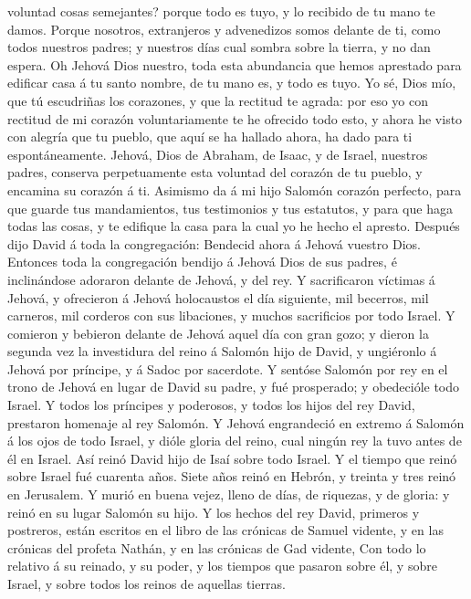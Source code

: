voluntad cosas semejantes? porque todo es tuyo, y lo recibido de tu mano
te damos.  Porque nosotros, extranjeros y advenedizos somos
delante de ti, como todos nuestros padres; y nuestros días cual sombra
sobre la tierra, y no dan espera.  Oh Jehová Dios nuestro,
toda esta abundancia que hemos aprestado para edificar casa á tu santo
nombre, de tu mano es, y todo es tuyo.  Yo sé, Dios mío,
que tú escudriñas los corazones, y que la rectitud te agrada: por eso yo
con rectitud de mi corazón voluntariamente te he ofrecido todo esto, y
ahora he visto con alegría que tu pueblo, que aquí se ha hallado ahora,
ha dado para ti espontáneamente.  Jehová, Dios de Abraham,
de Isaac, y de Israel, nuestros padres, conserva perpetuamente esta
voluntad del corazón de tu pueblo, y encamina su corazón á ti.
 Asimismo da á mi hijo Salomón corazón perfecto, para que
guarde tus mandamientos, tus testimonios y tus estatutos, y para que
haga todas las cosas, y te edifique la casa para la cual yo he hecho el
apresto.  Después dijo David á toda la congregación:
Bendecid ahora á Jehová vuestro Dios. Entonces toda la congregación
bendijo á Jehová Dios de sus padres, é inclinándose adoraron delante de
Jehová, y del rey.  Y sacrificaron víctimas á Jehová, y
ofrecieron á Jehová holocaustos el día siguiente, mil becerros, mil
carneros, mil corderos con sus libaciones, y muchos sacrificios por todo
Israel.  Y comieron y bebieron delante de Jehová aquel día
con gran gozo; y dieron la segunda vez la investidura del reino á
Salomón hijo de David, y ungiéronlo á Jehová por príncipe, y á Sadoc por
sacerdote.  Y sentóse Salomón por rey en el trono de Jehová
en lugar de David su padre, y fué prosperado; y obedecióle todo Israel.
 Y todos los príncipes y poderosos, y todos los hijos del
rey David, prestaron homenaje al rey Salomón.  Y Jehová
engrandeció en extremo á Salomón á los ojos de todo Israel, y dióle
gloria del reino, cual ningún rey la tuvo antes de él en Israel.
 Así reinó David hijo de Isaí sobre todo Israel.
 Y el tiempo que reinó sobre Israel fué cuarenta años.
Siete años reinó en Hebrón, y treinta y tres reinó en Jerusalem.
 Y murió en buena vejez, lleno de días, de riquezas, y de
gloria: y reinó en su lugar Salomón su hijo.  Y los hechos
del rey David, primeros y postreros, están escritos en el libro de las
crónicas de Samuel vidente, y en las crónicas del profeta Nathán, y en
las crónicas de Gad vidente,  Con todo lo relativo á su
reinado, y su poder, y los tiempos que pasaron sobre él, y sobre Israel,
y sobre todos los reinos de aquellas tierras.

